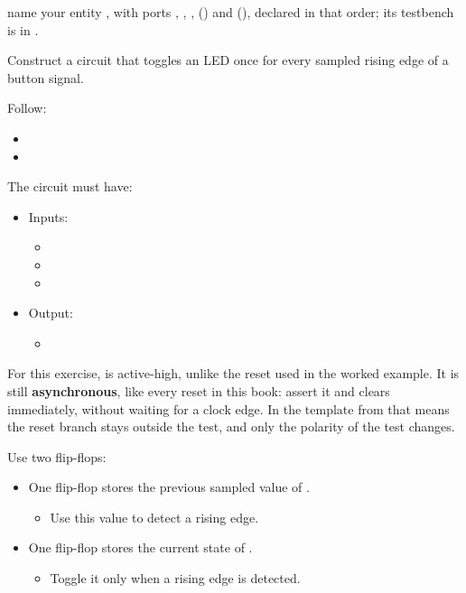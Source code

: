 
\selfcheck name your entity , with ports , ,
,  () and 
(), declared in that order; its testbench is in
.

\label{c3:set:4}

\label{c3:ex:4}
Construct a circuit that toggles an LED once for every sampled rising edge of a button signal.

Follow:
\begin{itemize}
  \item {}
  \item {}
\end{itemize}
The circuit must have:
\begin{itemize}
  \item Inputs:
    \begin{itemize}
      \item {}
      \item {}
      \item {}
    \end{itemize}
  \item Output:
    \begin{itemize}
      \item {}
    \end{itemize}
\end{itemize}
For this exercise,  is active-high, unlike the reset used in the worked example. It is
still \textbf{asynchronous}, like every reset in this book: assert it and  clears
immediately, without waiting for a clock edge. In the template from  that means the
reset branch stays outside the  test, and only the polarity of the test
changes.

\note[Tip] Use two flip-flops:
\begin{itemize}
  \item One flip-flop stores the previous sampled value of .
    \begin{itemize}
      \item Use this value to detect a rising edge.
    \end{itemize}
  \item One flip-flop stores the current state of .
    \begin{itemize}
      \item Toggle it only when a rising edge is detected.
    \end{itemize}
\end{itemize}

